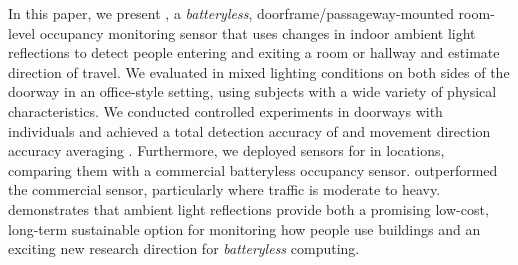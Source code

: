 In this paper, we present \sysname, a \textit{batteryless}, doorframe/passageway-mounted room-level occupancy monitoring sensor that uses changes in indoor ambient light reflections to detect people entering and exiting a room or hallway and estimate direction of travel. We evaluated \sysname in mixed lighting conditions on both sides of the doorway in an office-style setting, using subjects with a wide variety of physical characteristics. We conducted \numExp controlled experiments in \numDoors doorways with \numPeople individuals and achieved a total detection accuracy of \SysAccuracy and movement direction accuracy averaging \dirAccuracy. Furthermore, we deployed \sysname sensors for \ITWdays in \ITWdeployedWaldos locations, comparing them with a commercial batteryless occupancy sensor. \sysname outperformed the commercial sensor, particularly where traffic is moderate to heavy. \sysname demonstrates that ambient light reflections provide both a promising low-cost, long-term sustainable option for monitoring how people use buildings and an exciting new research direction for \textit{batteryless} computing.
